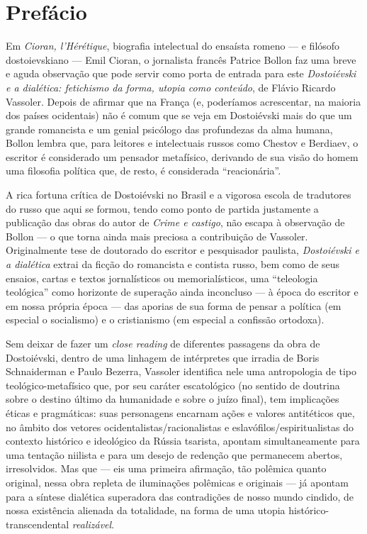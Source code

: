 \chapter*{Prefácio}



Em \emph{Cioran, l'Hérétique}, biografia intelectual do ensaísta romeno
--- e filósofo dostoievskiano --- Emil Cioran, o jornalista francês
Patrice Bollon faz uma breve e aguda observação que pode servir como
porta de entrada para este \emph{Dostoiévski e a dialética: fetichismo
da forma, utopia como conteúdo}, de Flávio Ricardo Vassoler. Depois de
afirmar que na França (e, poderíamos acrescentar, na maioria dos países
ocidentais) não é comum que se veja em Dostoiévski mais do que um grande
romancista e um genial psicólogo das profundezas da alma humana, Bollon
lembra que, para leitores e intelectuais russos como Chestov e Berdiaev,
o escritor é considerado um pensador metafísico, derivando de sua visão
do homem uma filosofia política que, de resto, é considerada
``reacionária''.

A rica fortuna crítica de Dostoiévski no Brasil e a vigorosa escola de
tradutores do russo que aqui se formou, tendo como ponto de partida
justamente a publicação das obras do autor de \emph{Crime e castigo},
não escapa à observação de Bollon --- o que torna ainda mais preciosa a
contribuição de Vassoler. Originalmente tese de doutorado do escritor e
pesquisador paulista, \emph{Dostoiévski e a dialética} extrai da
ficção do romancista e contista russo, bem como de seus ensaios, cartas
e textos jornalísticos ou memorialísticos, uma ``teleologia teológica''
como horizonte de superação ainda inconcluso --- à época do escritor e em
nossa própria época --- das aporias de sua forma de pensar a política (em
especial o socialismo) e o cristianismo (em especial a confissão
ortodoxa).

Sem deixar de fazer um \emph{close reading} de diferentes passagens da
obra de Dostoiévski, dentro de uma linhagem de intérpretes que irradia
de Boris Schnaiderman e Paulo Bezerra, Vassoler identifica nele uma
antropologia de tipo teológico-metafísico que, por seu caráter
escatológico (no sentido de doutrina sobre o destino último da
humanidade e sobre o juízo final), tem implicações éticas e pragmáticas:
suas personagens encarnam ações e valores antitéticos que, no âmbito dos
vetores ocidentalistas/racionalistas e eslavófilos/espiritualistas do
contexto histórico e ideológico da Rússia tsarista, apontam
simultaneamente para uma tentação niilista e para um desejo de redenção
que permanecem abertos, irresolvidos. Mas que --- eis uma primeira
afirmação, tão polêmica quanto original, nessa obra repleta de
iluminações polêmicas e originais --- já apontam para a síntese dialética
superadora das contradições de nosso mundo cindido, de nossa existência
alienada da totalidade, na forma de uma utopia histórico-transcendental
\emph{realizável}.

